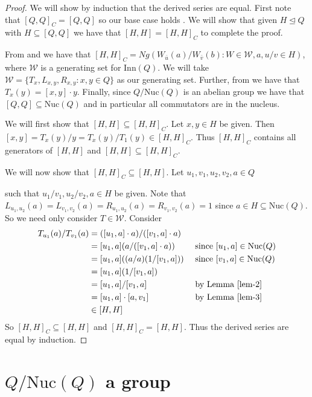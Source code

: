 \documentclass[12pt]{report}
\theoremstyle{definition}
\newcommand{\rdv}{/}                %
\newcommand{\nuc}{\text{Nuc}}       %
\newcommand{\inn}{\text{Inn}}       %
\begin{document}
\begin{proof}
  We will show by induction that the derived series are equal. First note that $[Q, Q]_C = [Q, Q]$
    so our base case holds \cite{ComTheory}. We will show that given $H\unlhd Q$ with
    $H\subseteq [Q, Q]$ we have that $[H, H] = [H, H]_C$ to complete the proof.

  From \cite{ComTheory} and \cite{BK-inner} we have that
    $[H, H]_C = Ng(W_{\bar{u}}(a)/W_{\bar{v}}(b) : W\in\mathcal{W}, a, u/v\in H)$, where
    $\mathcal{W}$ is a generating set for $\inn(Q)$. We will take
    $\mathcal{W} = \{T_x, L_{x, y}, R_{x, y} : x, y\in Q\}$ as our generating set. Further,
    from \cite{PACC} we have that $T_x(y) = [x, y]\cdot y$. Finally, since $Q\rdv\nuc(Q)$ is
    an abelian group we have that $[Q, Q]\subseteq \nuc(Q)$ and in particular all
    commutators are in the nucleus.

  We will first show that $[H, H]\subseteq [H, H]_C$. Let $x, y\in H$ be given. Then
    $[x, y] = T_x(y)\rdv y = T_x(y)\rdv T_1(y) \in [H, H]_C$. Thus $[H, H]_C$ contains
    all generators of $[H, H]$ and $[H, H]\subseteq [H, H]_C$.

  We will now show that $[H, H]_C\subseteq [H, H]$. Let $u_1, v_1, u_2, v_2, a\in Q$

    such that $u_1\rdv v_1, u_2\rdv v_2, a\in H$ be given. Note that
    $L_{u_1, u_2}(a) = L_{v_1, v_2}(a) = R_{u_1, u_2}(a) = R_{v_1, v_2}(a) = 1$ since
    $a\in H\subseteq \nuc(Q)$. So we need only consider $T\in\mathcal{W}$. Consider
  \begin{alignat*}{2}
    T_{u_1}(a)\rdv T_{v_1}(a) &= ([u_1, a]\cdot a)\rdv ([v_1, a]\cdot a) &&\\
    &= [u_1, a](a\rdv([v_1, a]\cdot a)) &&\text{ since $[u_1, a]\in\nuc(Q)$}\\
    &= [u_1, a]((a\rdv a)(1\rdv[v_1, a])) &&\text{ since $[v_1, a]\in\nuc(Q)$}\\
    &= [u_1, a](1\rdv [v_1, a]) &&\\
    &= [u_1, a]\rdv [v_1, a] &&\text{ by Lemma \ref{lem-2}}\\
    &= [u_1, a]\cdot [a, v_1] &&\text{ by Lemma \ref{lem-3}}\\
    &\in [H, H]
  \end{alignat*}
  So $[H, H]_C\subseteq [H, H]$ and $[H, H]_C = [H, H]$. Thus the derived series are equal by induction.
\end{proof}

\section{$Q/\nuc(Q)$ a group}
\label{sec:innMappings}
\end{document}
